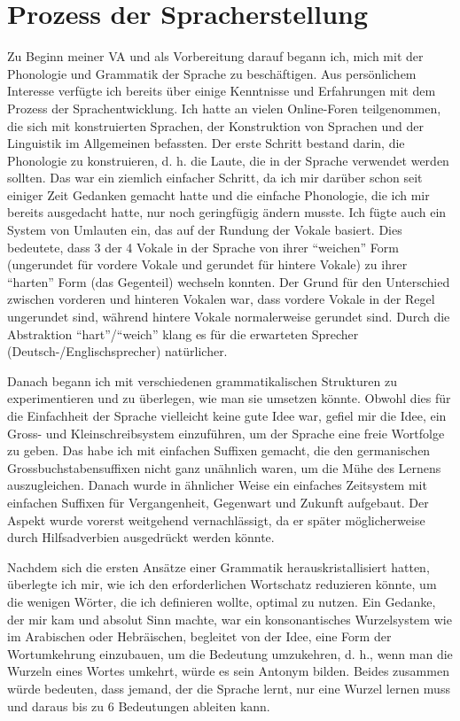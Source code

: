 \documentclass{article}
\begin{document}
\section{Prozess der Spracherstellung}
Zu Beginn meiner VA und als Vorbereitung darauf begann ich, mich mit der Phonologie und Grammatik der Sprache zu beschäftigen.
Aus persönlichem Interesse verfügte ich bereits über einige Kenntnisse und Erfahrungen mit dem Prozess der Sprachentwicklung.
Ich hatte an vielen Online-Foren teilgenommen, die sich mit konstruierten Sprachen, der Konstruktion von Sprachen und der
Linguistik im Allgemeinen befassten. Der erste Schritt bestand darin, die Phonologie zu konstruieren, d. h. die Laute,
die in der Sprache verwendet werden sollten. Das war ein ziemlich einfacher Schritt, da ich mir darüber schon seit einiger
Zeit Gedanken gemacht hatte und die einfache Phonologie, die ich mir bereits ausgedacht hatte, nur noch geringfügig ändern musste.
Ich fügte auch ein System von Umlauten ein, das auf der Rundung der Vokale basiert. Dies bedeutete, dass 3 der 4 Vokale
in der Sprache von ihrer ``weichen'' Form (ungerundet für vordere Vokale und gerundet für hintere Vokale) zu ihrer ``harten'' Form
(das Gegenteil) wechseln konnten. Der Grund für den Unterschied zwischen vorderen und hinteren Vokalen war, dass vordere Vokale
in der Regel ungerundet sind, während hintere Vokale normalerweise gerundet sind.\cite{Stevens72} Durch die Abstraktion
``hart''/``weich'' klang es für die erwarteten Sprecher (Deutsch-/Englischsprecher) natürlicher.

Danach begann ich mit verschiedenen grammatikalischen Strukturen zu experimentieren und zu überlegen,
wie man sie umsetzen könnte. Obwohl dies für die Einfachheit der Sprache vielleicht keine gute Idee war,
gefiel mir die Idee, ein Gross- und Kleinschreibsystem einzuführen, um der Sprache eine freie Wortfolge zu geben.
Das habe ich mit einfachen Suffixen gemacht, die den germanischen Grossbuchstabensuffixen nicht ganz unähnlich waren,
um die Mühe des Lernens auszugleichen. Danach wurde in ähnlicher Weise ein einfaches Zeitsystem mit einfachen Suffixen
für Vergangenheit, Gegenwart und Zukunft aufgebaut. Der Aspekt wurde vorerst weitgehend vernachlässigt, da er später
möglicherweise durch Hilfsadverbien ausgedrückt werden könnte.

Nachdem sich die ersten Ansätze einer Grammatik herauskristallisiert hatten, überlegte ich mir,
wie ich den erforderlichen Wortschatz reduzieren könnte, um die wenigen Wörter, die ich definieren wollte,
optimal zu nutzen. Ein Gedanke, der mir kam und absolut Sinn machte, war ein konsonantisches Wurzelsystem wie im Arabischen
oder Hebräischen, begleitet von der Idee, eine Form der Wortumkehrung einzubauen, um die Bedeutung umzukehren, d. h.,
wenn man die Wurzeln eines Wortes umkehrt, würde es sein Antonym bilden. Beides zusammen würde bedeuten, dass jemand,
der die Sprache lernt, nur eine Wurzel lernen muss und daraus bis zu 6 Bedeutungen ableiten kann.
\end{document}
